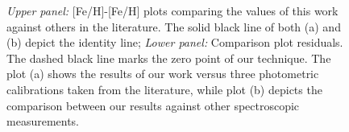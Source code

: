 \documentclass{aa}
\begin{document}
\begin{figure}[]
\begin{center}
\end{center}
\caption{\textit{Upper panel:} [Fe/H]-[Fe/H] plots comparing the values of this work against others in the literature. The solid black line of both (a) and (b) depict the identity line; \textit{Lower panel:} Comparison plot residuals. The dashed black line marks the zero point of our technique. The plot (a) shows the results of our work versus three photometric calibrations taken from the literature, while plot (b) depicts the comparison between our results against other spectroscopic measurements.}
\label{fig:compfeh}
\end{figure}
\end{document}
